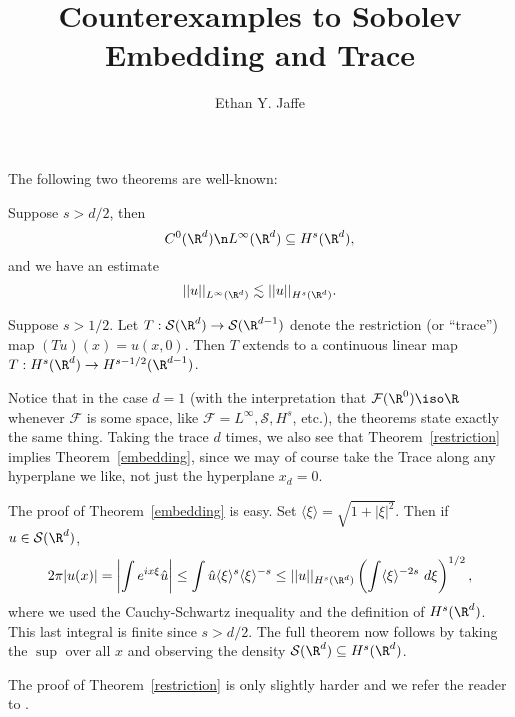 \documentclass[12pt]{article}
\title{Counterexamples to Sobolev Embedding and Trace}
\author{Ethan Y. Jaffe}
\date{}
\begin{document}
\maketitle
\setcounter{section}{1}
The following two theorems are well-known:
\begin{thm}\label{embedding}Suppose $s > d/2$, then
\[C^0(\R^d)\n L^{\infty}(\R^d) \subseteq H^{s}(\R^d),\]
and we have an estimate
\[||u||_{L^{\infty}(\R^d)} \lesssim ||u||_{H^s(\R^d)}.\]\end{thm}
\begin{thm}\label{restriction}Suppose $s > 1/2$. Let $T:\mathcal S(\R^d) \to \mathcal S(\R^{d-1})$ denote the restriction (or ``trace'') map $(Tu)(x) = u(x,0)$. Then $T$ extends to a continuous linear map $T:H^s(\R^d) \to H^{s-1/2}(\R^{d-1})$.\end{thm}
Notice that in the case $d=1$ (with the interpretation that $\mathcal F(\R^0) \iso \R$ whenever $\mathcal F$ is some space, like $\mathcal F = L^\infty,\mathcal S, H^s$, etc.), the theorems state exactly the same thing. Taking the trace $d$ times, we also see that Theorem~\ref{restriction} implies Theorem~\ref{embedding}, since we may of course take the Trace along any hyperplane we like, not just the hyperplane $x_d = 0$.

The proof of Theorem~\ref{embedding} is easy. Set $\langle \xi \rangle = \sqrt{1+|\xi|^2}$. Then if $u \in \mathcal S(\R^d)$,
\[2\pi |u(x)| = \left|\int e^{ix\xi}\hat{u}\right| \leq \int \hat{u}\langle \xi \rangle^{s}\langle \xi \rangle^{-s} \leq ||u||_{H^s(\R^d)}\left(\int \langle \xi \rangle^{-2s}\ d\xi\right)^{1/2},\]
where we used the Cauchy-Schwartz inequality and the definition of $H^s(\R^d)$. This last integral is finite since $s > d/2$. The full theorem now follows by taking the $\sup$ over all $x$ and observing the density $\mathcal S(\R^d) \subseteq H^s(\R^d)$.

The proof of Theorem~\ref{restriction} is only slightly harder and we refer the reader to \cite[Proposition~3.8]{hitch}.
\end{document}
